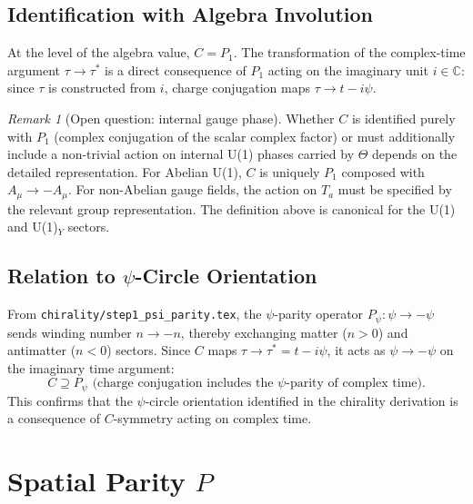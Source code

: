 \documentclass[12pt,a4paper]{article}
\theoremstyle{definition}
\theoremstyle{remark}
\newtheorem{remark}[theorem]{Remark}
\begin{document}
\subsection{Identification with Algebra Involution}

At the level of the algebra value, $C = P_1$.  The transformation of the
complex-time argument $\tau \to \tau^*$ is a direct consequence of
$P_1$ acting on the imaginary unit $i \in \mathbb{C}$: since $\tau$ is
constructed from $i$, charge conjugation maps $\tau \to t - i\psi$.

\begin{remark}[Open question: internal gauge phase]
\label{rem:sym:C_gauge_phase}
Whether $C$ is identified purely with $P_1$ (complex conjugation of the
scalar complex factor) or must additionally include a non-trivial action on
internal U(1) phases carried by $\Theta$ depends on the detailed
representation.
For Abelian U(1), $C$ is uniquely $P_1$ composed with $A_\mu \to -A_\mu$.
For non-Abelian gauge fields, the action on $T_a$ must be specified by
the relevant group representation.  The definition above is canonical for
the U(1) and U(1)$_Y$ sectors.
\end{remark}

\subsection{Relation to $\psi$-Circle Orientation}

From \texttt{chirality/step1\_psi\_parity.tex}, the $\psi$-parity operator
$P_\psi: \psi \to -\psi$ sends winding number $n \to -n$, thereby exchanging
matter ($n > 0$) and antimatter ($n < 0$) sectors.
Since $C$ maps $\tau \to \tau^* = t - i\psi$, it acts as
$\psi \to -\psi$ on the imaginary time argument:
\begin{equation}
  \boxed{C \supseteq P_\psi
  \text{ (charge conjugation includes the $\psi$-parity of complex time)}.}
  \label{eq:sym:C_Ppsi}
\end{equation}
This confirms that the $\psi$-circle orientation identified in the chirality
derivation is a consequence of $C$-symmetry acting on complex time.

\section{Spatial Parity $P$}
\label{sec:sym:P}
\end{document}

